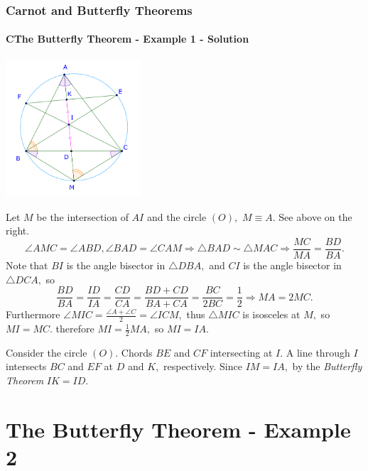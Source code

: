 \documentclass[8pt,xcolor=table,dvipsnames]{beamer}
\providecommand{\half}{\frac{1}{2}}
\begin{document}
\begin{frame}[t]
    \frametitle{Carnot and Butterfly Theorems}
    \framesubtitle{CThe Butterfly Theorem - Example 1 - Solution}
    \begin{center}
        \includegraphics[width=5cm]{./svg/pdf/24-25-s2-g3-p5-2.pdf}
    \end{center}
    \begin{overprint}
        Let $M$ be the intersection of $AI$ and the circle $(O),$ $M \equiv A.$ See above on the right.
        \[
            \angle AMC = \angle ABD, \angle BAD = \angle CAM \Rightarrow \triangle BAD \sim \triangle MAC \Rightarrow \frac{MC}{MA} = \frac{BD}{BA}.
        \]
        Note that $BI$ is the angle bisector in $\triangle DBA,$ and $CI$ is the angle bisector in $\triangle DCA,$ so 
        \[
            \frac{BD}{BA} = \frac{ID}{IA} = \frac{CD}{CA} = \frac{BD + CD}{BA + CA} = \frac{BC}{2BC} = \frac{1}{2}
            \Rightarrow MA = 2MC.
        \]
        Furthermore $\angle MIC = \frac{\angle A + \angle C}{2} = \angle ICM,$ thus $\triangle MIC$ is isosceles at $M,$
        so $MI = MC.$ therefore $MI = \half MA,$ so $MI = IA.$   
        
        Consider the circle $(O).$ Chords $BE$ and $CF$ intersecting at $I.$ A line through $I$ intersects $BC$ and $EF$ at $D$ and $K,$ respectively.
        Since $IM = IA,$ by the \textit{Butterfly Theorem} $\boxed{IK = ID.}$
    \end{overprint}        
\end{frame}

\section{The Butterfly Theorem - Example 2}
\end{document}
